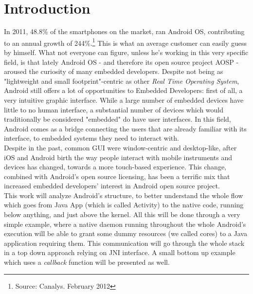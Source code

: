 
\section{Introduction}
In 2011, 48.8\% of the smartphones on the market, ran Android OS, contributing to an annual growth of 244\%.\footnote{Source: Canalys. February 2012} This is what an average customer can easily guess by himself. What not everyone can figure, unless he's working in this very specific field, is that lately Android OS - and therefore its open source project AOSP - aroused the curiosity of many embedded developers. Despite not being as "lightweight and small footprint"-centric as other \textit{Real Time Operating System}, Android still offers a lot of opportunities to Embedded Developers: first of all, a very intuitive graphic interface. While a large number of embedded devices have little to no human interface, a substantial number of devices which would traditionally be considered "embedded" do have user interfaces. In this field, Android comes as a bridge connecting the users that are already familiar with its interface, to embedded systems they need to interact with.\\
Despite in the past, common GUI were window-centric and desktop-like, after iOS and Android birth the way people interact with mobile instruments and devices has changed, towards a more touch-based experience. This change, combined with Android's open source licensing, has been a terrific mix that increased embedded developers' interest in Android open source project.\\
This work will analyze Android's structure, to better understand the whole flow which goes from Java App (which is called Activity) to the native code, running below anything, and just above the kernel. All this will be done through a very simple example, where a native daemon running throughout the whole Android's execution will be able to grant some dummy resources (we called cores) to a Java application requiring them. This communication will go through the whole stack in a top down approach relying on JNI interface. A small bottom up example which uses a \textit{callback} function will be presented as well.